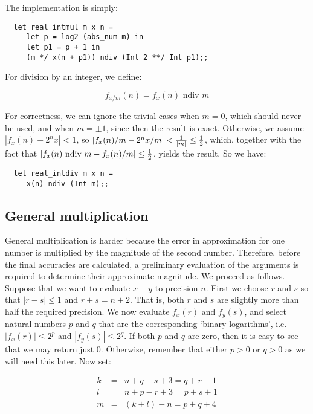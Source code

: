 \noindent The implementation is simply:

\begin{boxed}\begin{lstlisting}
  let real_intmul m x n =
     let p = log2 (abs_num m) in
     let p1 = p + 1 in
     (m */ x(n + p1)) ndiv (Int 2 **/ Int p1);;
\end{lstlisting}\end{boxed}

\noindent For division by an integer, we define:

$$ f_{x / m}(n) = f_x(n) \mbox{ ndiv } m $$

For correctness, we can ignore the trivial cases when  $m = 0$, which should
never be used, and when $m = \pm 1$, since then the result is exact. Otherwise,
we assume $|f_x(n) - 2^n x| < 1$, so $|f_x(n) / m - 2^n x / m| < {1 \over |m|}
\leq {1 \over 2}$, which, together with the fact that $|f_x(n) \mbox{ ndiv } m
- f_x(n) / m| \leq {1 \over 2}$, yields the result. So we have:

\begin{boxed}\begin{lstlisting}
  let real_intdiv m x n =
     x(n) ndiv (Int m);;
\end{lstlisting}\end{boxed}

\subsection{General multiplication}

General multiplication is harder because the error in approximation for one
number is multiplied by the magnitude of the second number. Therefore, before
the final accuracies are calculated, a preliminary evaluation of the arguments
is required to determine their approximate magnitude. We proceed as follows.
Suppose that we want to evaluate $x + y$ to precision $n$. First we choose $r$
and $s$ so that $|r - s| \leq 1$ and $r + s = n + 2$. That is, both $r$ and $s$
are slightly more than half the required precision. We now evaluate $f_x(r)$
and $f_y(s)$, and select natural numbers $p$ and $q$ that are the corresponding
`binary logarithms', i.e. $|f_x(r)| \leq 2^p$ and $|f_y(s)| \leq 2^q$. If both
$p$ and $q$ are zero, then it is easy to see that we may return just $0$.
Otherwise, remember that either $p > 0$ or $q > 0$ as we will need this later.
Now set:

\begin{eqnarray*}
k &= &n + q - s + 3 =  q + r + 1           \\
l &= &n + p - r + 3 =  p + s + 1           \\
m &= &(k + l) - n =  p + q + 4
\end{eqnarray*}


